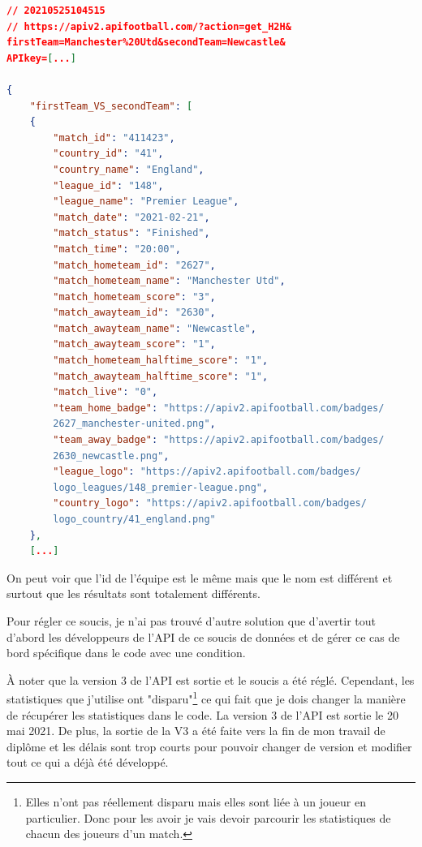 \documentclass[a4paper,14pt]{extarticle}
\begin{document}
{\begin{lstlisting}[language=json, firstnumber=1, caption=Aperçu du JSON avec "Manchester United", captionpos=b, label=apercuJSON]
// 20210525104515
// https://apiv2.apifootball.com/?action=get_H2H&
firstTeam=Manchester%20Utd&secondTeam=Newcastle&
APIkey=[...]

{
    "firstTeam_VS_secondTeam": [
    {
        "match_id": "411423",
        "country_id": "41",
        "country_name": "England",
        "league_id": "148",
        "league_name": "Premier League",
        "match_date": "2021-02-21",
        "match_status": "Finished",
        "match_time": "20:00",
        "match_hometeam_id": "2627",
        "match_hometeam_name": "Manchester Utd",
        "match_hometeam_score": "3",
        "match_awayteam_id": "2630",
        "match_awayteam_name": "Newcastle",
        "match_awayteam_score": "1",
        "match_hometeam_halftime_score": "1",
        "match_awayteam_halftime_score": "1",
        "match_live": "0",
        "team_home_badge": "https://apiv2.apifootball.com/badges/
        2627_manchester-united.png",
        "team_away_badge": "https://apiv2.apifootball.com/badges/
        2630_newcastle.png",
        "league_logo": "https://apiv2.apifootball.com/badges/
        logo_leagues/148_premier-league.png",
        "country_logo": "https://apiv2.apifootball.com/badges/
        logo_country/41_england.png"
    },
    [...]
\end{lstlisting}

On peut voir que l'id de l'équipe est le même mais que le nom est différent et surtout que les résultats sont totalement différents.

Pour régler ce soucis, je n'ai pas trouvé d'autre solution que d'avertir tout d'abord les développeurs de l'API de ce soucis de données et de gérer ce cas de bord spécifique dans le code avec une condition.

À noter que la version 3 de l'API est sortie et le soucis a été réglé. Cependant, les statistiques que j'utilise ont "disparu"\footnote{Elles n'ont pas réellement disparu mais elles sont liée à un joueur en particulier. Donc pour les avoir je vais devoir parcourir les statistiques de chacun des joueurs d'un match.} ce qui fait que je dois changer la manière de récupérer les statistiques dans le code. La version 3 de l'API est sortie le 20 mai 2021. De plus, la sortie de la V3 a été faite vers la fin de mon travail de diplôme et les délais sont trop courts pour pouvoir changer de version et modifier tout ce qui a déjà été développé. 

}
\end{document}
